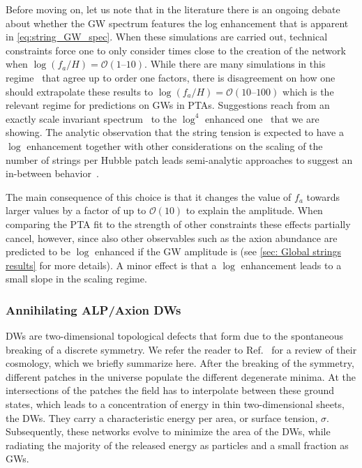 \documentclass{article}
\begin{document}
Before moving on, let us note that in the literature there is an ongoing debate about whether the GW spectrum features the log enhancement that is apparent in \cref{eq:string_GW_spec}. When these simulations are carried out, technical constraints force one to only consider times close to the creation of the network when $\log(f_a/H)=\mathcal{O}(\numrange{1}{10})$. While there are many simulations in this regime~\cite{Gorghetto:2018myk,Gorghetto:2021fsn,Buschmann:2021sdq,Figueroa:2020lvo} that agree up to order one factors, there is disagreement on how one should extrapolate these results to $\log(f_a/H)=\mathcal{O}(\numrange{10}{100})$ which is the relevant regime for predictions on GWs in PTAs. Suggestions reach from an exactly scale invariant spectrum~\cite{Figueroa:2020lvo,Hindmarsh:2021vih} to the $\log^4$ enhanced one~\cite{Gorghetto:2018myk,Gorghetto:2021fsn} that we are showing. The analytic observation that the string tension is expected to have a $\log$ enhancement together with other considerations on the scaling of the number of strings per Hubble patch leads semi-analytic approaches  to suggest an in-between behavior~\cite{Gouttenoire:2021jhk, Gouttenoire:2019kij, Chang:2021afa}. 

The main consequence of this choice is that it changes the value of $f_a$ towards larger values by a factor of up to $\mathcal{O}(10)$ to explain the amplitude.
When comparing the PTA fit to the strength of other constraints these effects partially cancel, however, since also other observables such as the axion abundance are predicted to be $\log$ enhanced if the GW amplitude is (see \cref{sec: Global strings results} for more details).  A minor effect is that a $\log$ enhancement leads to a small slope in the scaling regime.

    
%
\subsubsection{Annihilating ALP/Axion DWs}
\label{sec:ALP_DW}
%

DWs are two-dimensional topological defects that form due to the spontaneous breaking of a discrete symmetry. We refer the reader to Ref.~\cite{Saikawa:2017hiv} for a review of their cosmology, which we briefly summarize here. After the breaking of the symmetry, different patches in the universe populate the different degenerate minima. At the intersections of the patches the field has to interpolate between these ground states, which leads to a concentration of energy in thin two-dimensional sheets, the DWs. They carry a characteristic energy per area, or surface tension, $\sigma$. Subsequently, these networks evolve to minimize the area of the DWs, while radiating the majority of the released energy as particles and a small fraction as GWs.
\end{document}
